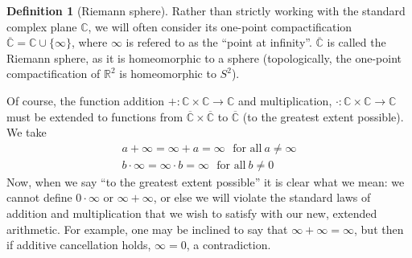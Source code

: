 \documentclass[aps,pra,showpacs,notitlepage,onecolumn,superscriptaddress,nofootinbib]{revtex4-1}
\theoremstyle{definition}
\newtheorem{definition}{Definition}[section]
\begin{document}
\begin{definition}[Riemann sphere]
  Rather than strictly working with the standard complex plane $\mathbb{C}$, we will often consider its one-point compactification $\overline{\mathbb{C}} = \mathbb{C} \cup \{\infty\}$, where $\infty$ is refered to as the ``point at infinity''.
  $\overline{\mathbb{C}}$ is called the Riemann sphere, as it is homeomorphic to a sphere (topologically, the one-point compactification of $\mathbb{R}^2$ is homeomorphic to $S^2$).

  Of course, the function addition $+ : \mathbb{C} \times \mathbb{C} \rightarrow \mathbb{C}$ and multiplication, $\cdot : \mathbb{C} \times \mathbb{C} \rightarrow \mathbb{C}$ must be extended to functions from $\overline{\mathbb{C}} \times \overline{\mathbb{C}}$ 
  to $\overline{\mathbb{C}}$ (to the greatest extent possible). We take
  \begin{align}
    a + \infty = \infty + a = \infty \ \ \ \text{for all} \ a \neq \infty \\
    b \cdot \infty = \infty \cdot b = \infty \ \ \ \text{for all} \ b \neq 0
  \end{align}
  Now, when we say ``to the greatest extent possible'' it is clear what we mean: we cannot define $0 \cdot \infty$ or $\infty + \infty$, or else we will violate the standard laws of addition and multiplication that we wish to satisfy with our new, extended arithmetic.
  For example, one may be inclined to say that $\infty + \infty = \infty$, but then if additive cancellation holds, $\infty = 0$, a contradiction.
\end{definition}
\end{document}
